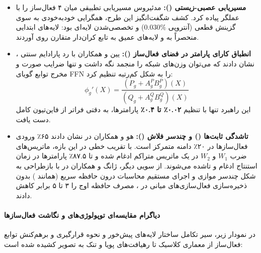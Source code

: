 \begin{itemize}
    \item \textbf{مسیریابی عصبی-زیستی ():} مدئیروس \cite{medeiros2026polyglu} مسیریابی تطبیقی میان ۴ فعال‌ساز را با عملگر  پیاده کرد. کشف شگفت‌انگیز این طرح، همگرایی خودبه‌خودی به سوی گزینش قطعی (آنتروپی $0.030\%$) و تخصصی‌شدن لایه‌ای بود: لایه‌های ابتدایی منحصراً به  و لایه‌های عمیق به تابع کران‌دار متقارن  روی آوردند.

    \item \textbf{انطباق کارای پارامتر در فضای فعال‌ساز ():} یین و همکاران \cite{yin2025nora} با رد پارادایم سنتی ، نشان دادند که می‌توان وزن‌های شبکه را منجمد نگه داشت و تنها ضرایب صورت و مخرج توابع گویای FFN را به شکل کم‌رتبه تنظیم کرد:
    \begin{equation}
        \phi_g'(X) = \frac{(P_g + A_g^P B_g^P)(X)}{(Q_g + A_g^Q B_g^Q)(X)}
    \end{equation}
    این راهبرد تنها با تنظیم \textbf{۰.۰۲٪ تا ۰.۴٪} پارامترها، به دقتی فراتر از فاین‌تیون کامل دست یافت.

    \item \textbf{تاشدگی ثابت‌ها () و  چندسر فلاش ():} 
    هو و همکاران در  \cite{hu2025tardis} نشان دادند ۶۵٪ ورودی فعال‌ساز‌ها در ۲۰٪ دامنه متمرکز است. با تقریب خطی در این بازه، ماتریس‌های ضرب $W_1$ و $W_2$ در یک ماتریس متراکم ادغام شده و تا ۸۷.۵٪ پارامترها در زمان استنتاج ادغام و تاشده می‌شوند. 
    از سویی دیگر، ژانگ و همکاران در  \cite{zhang2025flashmhf} با بازطراحی  به شکل چندسر موازی و اجرای مستقیم محاسبات درون حافظه سریع  (همانند ) بدون ذخیره‌سازی فعال‌سازی‌های میانی در ، مصرف حافظه اوج را ۳ تا ۵ برابر کاهش دادند.
\end{itemize}

\paragraph*{دیاگرام مقایسه‌ای توپولوژی‌های  و نگاشت فعال‌ساز‌ها}
در نمودار زیر، سیر تکامل ساختار لایه‌های پیش‌خور و نحوه قرارگیری و برهم‌کنش توابع فعال‌ساز از معماری کلاسیک تا رهیافت‌های پویا و تنک به تصویر کشیده شده است:

